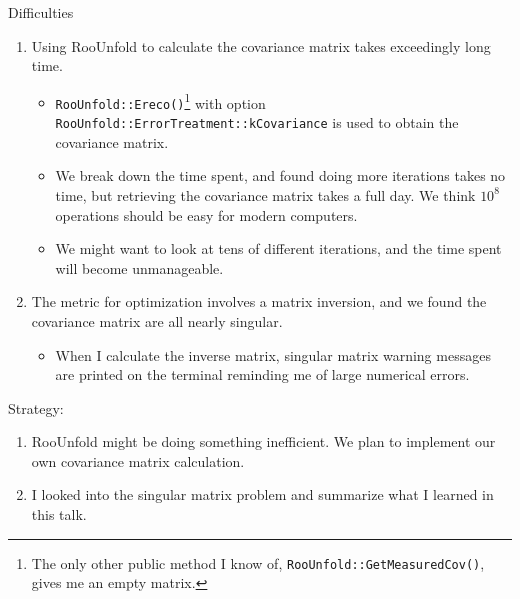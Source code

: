 \documentclass[aspectratio=169]{beamer}
\begin{document}
\begingroup
\footnotesize
\begin{frame}{Difficulties}
  \begin{enumerate}
    \item Using RooUnfold to calculate the covariance matrix takes exceedingly long time.
    \begin{itemize}
      \scriptsize
      \item \texttt{RooUnfold::Ereco()}\footnote{The only other public method I know of, \texttt{RooUnfold::GetMeasuredCov()}, gives me an empty matrix.} with option \texttt{RooUnfold::ErrorTreatment::kCovariance} is used to obtain the covariance matrix.
      \item We break down the time spent, and found doing more iterations takes no time, but retrieving the covariance matrix takes a full day. We think $10^8$ operations should be easy for modern computers.
      \item We might want to look at tens of different iterations, and the time spent will become unmanageable.
    \end{itemize}
    \item The metric for optimization involves a matrix inversion, and we found the covariance matrix are all nearly singular.
    \begin{itemize}
      \scriptsize
      \item When I calculate the inverse matrix, singular matrix warning messages are printed on the terminal reminding me of large numerical errors.
    \end{itemize}
  \end{enumerate}
  Strategy:
  \begin{enumerate}
    \item RooUnfold might be doing something inefficient. We plan to implement our own covariance matrix calculation.
    \item I looked into the singular matrix problem and summarize what I learned in this talk.
  \end{enumerate}
\end{frame}
\endgroup
\end{document}
